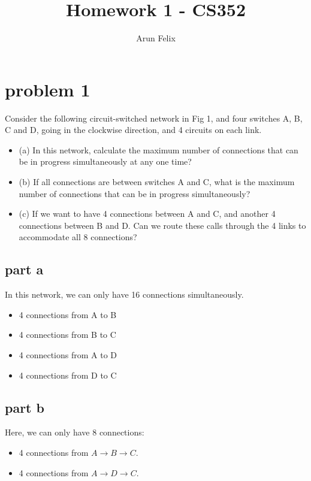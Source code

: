 \documentclass{article}
\title{Homework 1 - CS352}
\author{Arun Felix}
\begin{document}
    \maketitle
    \tableofcontents
\newpage
\section{problem 1}

Consider the following circuit-switched network in Fig 1, and four switches A, B, C and D, going in the clockwise direction, and 4 circuits on each link. 

\begin{itemize}
    \item (a) In this network, calculate the maximum number of connections that can be in progress simultaneously at any one time? 
    \item (b) If all connections are between switches A and C, what is the maximum number of connections that can be in progress simultaneously?
    \item (c) If we want to have 4 connections between A and C, and
    another 4 connections between B and D. Can we route these calls through the 4 links to accommodate all 8 connections?
\end{itemize}

\subsection{part a}
In this network, we can only have 16 connections simultaneously.
\begin{itemize}
    \item 4 connections from A to B
    \item 4 connections from B to C
    \item 4 connections from A to D
    \item 4 connections from D to C
\end{itemize}

\subsection{part b}

Here, we can only have 8 connections:
\begin{itemize}
    \item 4 connections from $A \rightarrow B \rightarrow C$.
    \item 4 connections from $A \rightarrow D \rightarrow C$.
\end{itemize}
\end{document}
